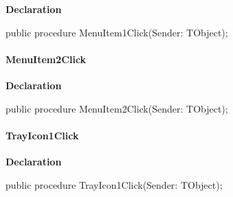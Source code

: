 \documentclass{report}
\newif\ifpdf
\begin{document}
\label{mnupdate.TUMnForm-MenuItem1Click}
\begin{list}{}{
\setlength{\itemindent}{0cm}
\setlength{\listparindent}{0cm}
\setlength{\leftmargin}{\evensidemargin}
\addtolength{\leftmargin}{\tmplength}
\settowidth{\labelsep}{X}
\addtolength{\leftmargin}{\labelsep}
\setlength{\labelwidth}{\tmplength}
}
\item[\textbf{Declaration}\hfill]
\ifpdf
\begin{flushleft}
\fi
\begin{ttfamily}
public procedure MenuItem1Click(Sender: TObject);\end{ttfamily}

\ifpdf
\end{flushleft}
\fi

\end{list}
\paragraph*{MenuItem2Click}\hspace*{\fill}

\label{mnupdate.TUMnForm-MenuItem2Click}
\begin{list}{}{
\setlength{\itemindent}{0cm}
\setlength{\listparindent}{0cm}
\setlength{\leftmargin}{\evensidemargin}
\addtolength{\leftmargin}{\tmplength}
\settowidth{\labelsep}{X}
\addtolength{\leftmargin}{\labelsep}
\setlength{\labelwidth}{\tmplength}
}
\item[\textbf{Declaration}\hfill]
\ifpdf
\begin{flushleft}
\fi
\begin{ttfamily}
public procedure MenuItem2Click(Sender: TObject);\end{ttfamily}

\ifpdf
\end{flushleft}
\fi

\end{list}
\paragraph*{TrayIcon1Click}\hspace*{\fill}

\label{mnupdate.TUMnForm-TrayIcon1Click}
\begin{list}{}{
\setlength{\itemindent}{0cm}
\setlength{\listparindent}{0cm}
\setlength{\leftmargin}{\evensidemargin}
\addtolength{\leftmargin}{\tmplength}
\settowidth{\labelsep}{X}
\addtolength{\leftmargin}{\labelsep}
\setlength{\labelwidth}{\tmplength}
}
\item[\textbf{Declaration}\hfill]
\ifpdf
\begin{flushleft}
\fi
\begin{ttfamily}
public procedure TrayIcon1Click(Sender: TObject);\end{ttfamily}

\ifpdf
\end{flushleft}
\fi

\end{list}
\end{document}
